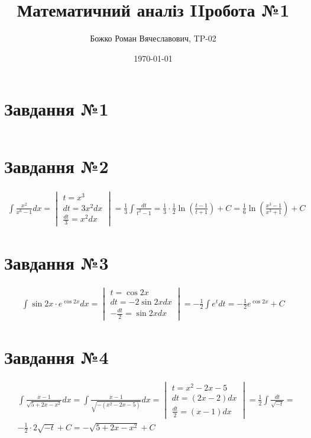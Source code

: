 \documentclass{report}
\begin{document}
\title{Математичний аналіз II робота №1}
\author{Божко Роман Вячеславович, TP-02}
\date{\today}

\maketitle

\section{Завдання №1}
\begin{equation}\label{eq1}\end{equation}

\section{Завдання №2}
\begin{equation}\label{eq2}\begin{split}
	\int \frac{x^{2}}{x^{6} - 1} dx = \begin{vmatrix}t = x^{3}\\dt = 3x^{2}dx\\\frac{dt}{3} = x^{2}dx\end{vmatrix} = \frac{1}{3}\int\frac{dt}{t^2 - 1} = \frac{1}{3} \cdot \frac{1}{2} \ln\left(\frac{t - 1}{t + 1}\right) + C = \frac{1}{6} \ln\left(\frac{x^3 - 1}{x^3 + 1}\right) + C
\end{split}\end{equation}

\section{Завдання №3}
\begin{equation}\label{eq3}\begin{split}
	\int \sin 2x \cdot e^{\cos 2x} dx = \begin{vmatrix}t = \cos 2x\\dt = -2\sin2xdx\\-\frac{dt}{2} = \sin2xdx\end{vmatrix} = -\frac{1}{2} \int e^{t} dt = -\frac{1}{2} e^{\cos 2x} + C
\end{split}\end{equation}

\section{Завдання №4}
\begin{equation}\label{eq4}\begin{split}
	& \int\frac{x - 1}{\sqrt{5 + 2x - x^2}}dx = \int \frac{x - 1}{\sqrt{-(x^2 - 2x - 5)}}dx = \begin{vmatrix}t = x^2 - 2x - 5\\dt = (2x - 2)dx\\\frac{dt}{2} = (x - 1)dx\end{vmatrix} = \frac{1}{2}\int\frac{dt}{\sqrt{-t}} =\\
	& -\frac{1}{2} \cdot 2\sqrt{-t} + C = - \sqrt{5 + 2x - x^2} + C
\end{split}\end{equation}
\end{document}
